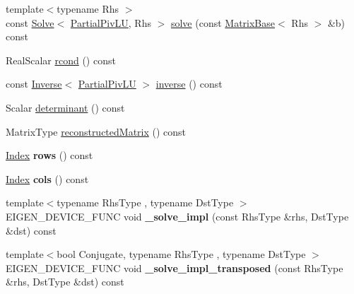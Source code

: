 \begin{DoxyCompactItemize}
\item 
{\footnotesize template$<$typename Rhs $>$ }\\const \hyperlink{group___core___module_class_eigen_1_1_solve}{Solve}$<$ \hyperlink{group___l_u___module_class_eigen_1_1_partial_piv_l_u}{Partial\+Piv\+LU}, Rhs $>$ \hyperlink{group___l_u___module_a49247bd2f742a46bca1f9c2bf1b19ad8}{solve} (const \hyperlink{group___core___module_class_eigen_1_1_matrix_base}{Matrix\+Base}$<$ Rhs $>$ \&b) const
\item 
Real\+Scalar \hyperlink{group___l_u___module_a472b46d5d9ff7c328e1dccc13805f690}{rcond} () const
\item 
const \hyperlink{class_eigen_1_1_inverse}{Inverse}$<$ \hyperlink{group___l_u___module_class_eigen_1_1_partial_piv_l_u}{Partial\+Piv\+LU} $>$ \hyperlink{group___l_u___module_aef983470f92aba829e861e32e68681b5}{inverse} () const
\item 
Scalar \hyperlink{group___l_u___module_a54c3d39c9b46ff485a8d2140b9b23193}{determinant} () const
\item 
Matrix\+Type \hyperlink{group___l_u___module_aba7f1ee83537b0d240ebf206503a4920}{reconstructed\+Matrix} () const
\item 
\mbox{\label{group___l_u___module_ad7a86697af02b65b13939d319e1d6840}} 
\hyperlink{group___core___module_a554f30542cc2316add4b1ea0a492ff02}{Index} {\bfseries rows} () const
\item 
\mbox{\label{group___l_u___module_a9aaa1eaccfb6ee5dfab78cb6e190929a}} 
\hyperlink{group___core___module_a554f30542cc2316add4b1ea0a492ff02}{Index} {\bfseries cols} () const
\item 
\mbox{\label{group___l_u___module_ab7e88bbaf3bb0172b9be97036be68999}} 
{\footnotesize template$<$typename Rhs\+Type , typename Dst\+Type $>$ }\\E\+I\+G\+E\+N\+\_\+\+D\+E\+V\+I\+C\+E\+\_\+\+F\+U\+NC void {\bfseries \+\_\+solve\+\_\+impl} (const Rhs\+Type \&rhs, Dst\+Type \&dst) const
\item 
\mbox{\label{group___l_u___module_a6e63a73644ef9fbe7856c8169287c7f5}} 
{\footnotesize template$<$bool Conjugate, typename Rhs\+Type , typename Dst\+Type $>$ }\\E\+I\+G\+E\+N\+\_\+\+D\+E\+V\+I\+C\+E\+\_\+\+F\+U\+NC void {\bfseries \+\_\+solve\+\_\+impl\+\_\+transposed} (const Rhs\+Type \&rhs, Dst\+Type \&dst) const

\end{DoxyCompactItemize}
